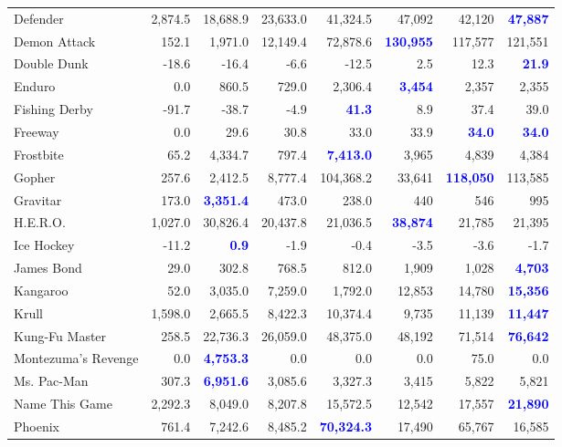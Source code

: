 \documentclass[letterpaper]{article}
\begin{document}
\begin{figure*}
\begin{tabular}{ l | r|r|r|r|r|r| r }
Defender & 2,874.5 & 18,688.9 & 23,633.0 & 41,324.5 & 47,092 & 42,120 & \textbf{\textcolor{blue}{47,887}} \\
Demon Attack & 152.1 & 1,971.0 & 12,149.4 & 72,878.6 & \textbf{\textcolor{blue}{130,955}} & 117,577 & 121,551 \\
Double Dunk & -18.6 & -16.4 & -6.6 & -12.5 & 2.5 & 12.3 & \textbf{\textcolor{blue}{21.9}} \\
Enduro & 0.0 & 860.5 & 729.0 & 2,306.4 & \textbf{\textcolor{blue}{3,454}} & 2,357 & 2,355 \\
Fishing Derby & -91.7 & -38.7 & -4.9 & \textbf{\textcolor{blue}{41.3}} & 8.9 & 37.4 & 39.0 \\
Freeway & 0.0 & 29.6 & 30.8 & 33.0 & 33.9 & \textbf{\textcolor{blue}{34.0}} & \textbf{\textcolor{blue}{34.0}} \\
Frostbite & 65.2 & 4,334.7 & 797.4 & \textbf{\textcolor{blue}{7,413.0}} & 3,965 & 4,839 & 4,384 \\
Gopher & 257.6 & 2,412.5 & 8,777.4 & 104,368.2 & 33,641 & \textbf{\textcolor{blue}{118,050}} & 113,585 \\
Gravitar & 173.0 & \textbf{\textcolor{blue}{3,351.4}} & 473.0 & 238.0 & 440 & 546 & 995 \\
H.E.R.O. & 1,027.0 & 30,826.4 & 20,437.8 & 21,036.5 & \textbf{\textcolor{blue}{38,874}} & 21,785 & 21,395 \\
Ice Hockey & -11.2 & \textbf{\textcolor{blue}{0.9}} & -1.9 & -0.4 & -3.5 & -3.6 & -1.7 \\
James Bond & 29.0 & 302.8 & 768.5 & 812.0 & 1,909 & 1,028 & \textbf{\textcolor{blue}{4,703}} \\
Kangaroo & 52.0 & 3,035.0 & 7,259.0 & 1,792.0 & 12,853 & 14,780 & \textbf{\textcolor{blue}{15,356}} \\
Krull & 1,598.0 & 2,665.5 & 8,422.3 & 10,374.4 & 9,735 & 11,139 & \textbf{\textcolor{blue}{11,447}} \\
Kung-Fu Master & 258.5 & 22,736.3 & 26,059.0 & 48,375.0 & 48,192 & 71,514 & \textbf{\textcolor{blue}{76,642}} \\
Montezuma's Revenge & 0.0 & \textbf{\textcolor{blue}{4,753.3}} & 0.0 & 0.0 & 0.0 & 75.0 & 0.0 \\
Ms. Pac-Man & 307.3 & \textbf{\textcolor{blue}{6,951.6}} & 3,085.6 & 3,327.3 & 3,415 & 5,822 & 5,821 \\
Name This Game & 2,292.3 & 8,049.0 & 8,207.8 & 15,572.5 & 12,542 & 17,557 & \textbf{\textcolor{blue}{21,890}} \\
Phoenix & 761.4 & 7,242.6 & 8,485.2 & \textbf{\textcolor{blue}{70,324.3}} & 17,490 & 65,767 & 16,585 \\

\end{tabular}
\end{figure*}
\end{document}
